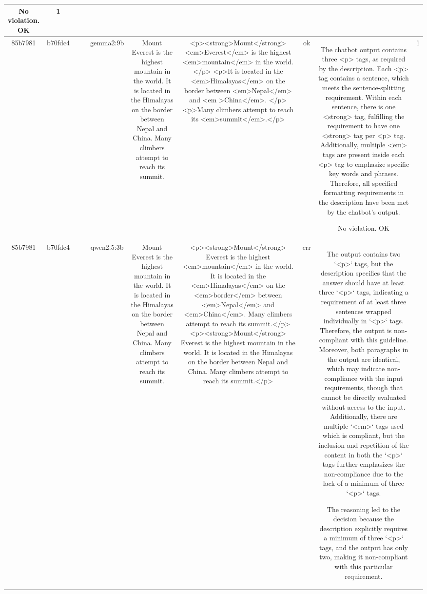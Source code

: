 \begin{table}[h!]
\begin{tabular}{|c|c|c|c|c|c|c|c|c|c|}
No violation.
OK & 1\\
\hline
85b7981 & b70fdc4 &  &  & gemma2:9b & Mount Everest is the highest mountain in the world. It is located in the Himalayas on the border between Nepal and China. Many climbers attempt to reach its summit. & <p><strong>Mount</strong> <em>Everest</em> is the highest <em>mountain</em> in the world.</p>
<p>It is located in the <em>Himalayas</em> on the border between <em>Nepal</em> and <em >China</em>. </p>
<p>Many climbers attempt to reach its <em>summit</em>.</p>  


 & ok & The chatbot output contains three <p> tags, as required by the description. Each <p> tag contains a sentence, which meets the sentence-splitting requirement. Within each sentence, there is one <strong> tag, fulfilling the requirement to have one <strong> tag per <p> tag. Additionally, multiple <em> tags are present inside each <p> tag to emphasize specific key words and phrases. Therefore, all specified formatting requirements in the description have been met by the chatbot's output.

No violation.
OK & 1\\
\hline
85b7981 & b70fdc4 &  &  & qwen2.5:3b & Mount Everest is the highest mountain in the world. It is located in the Himalayas on the border between Nepal and China. Many climbers attempt to reach its summit. & <p><strong>Mount</strong> Everest is the highest <em>mountain</em> in the world. It is located in the <em>Himalayas</em> on the <em>border</em> between <em>Nepal</em> and <em>China</em>. Many climbers attempt to reach its summit.</p>
<p><strong>Mount</strong> Everest is the highest mountain in the world. It is located in the Himalayas on the border between Nepal and China. Many climbers attempt to reach its summit.</p> & err & The output contains two `<p>` tags, but the description specifies that the answer should have at least three `<p>` tags, indicating a requirement of at least three sentences wrapped individually in `<p>` tags. Therefore, the output is non-compliant with this guideline. Moreover, both paragraphs in the output are identical, which may indicate non-compliance with the input requirements, though that cannot be directly evaluated without access to the input. Additionally, there are multiple `<em>` tags used which is compliant, but the inclusion and repetition of the content in both the `<p>` tags further emphasizes the non-compliance due to the lack of a minimum of three `<p>` tags.

The reasoning led to the decision because the description explicitly requires a minimum of three `<p>` tags, and the output has only two, making it non-compliant with this particular requirement.


\end{tabular}
\end{table}
